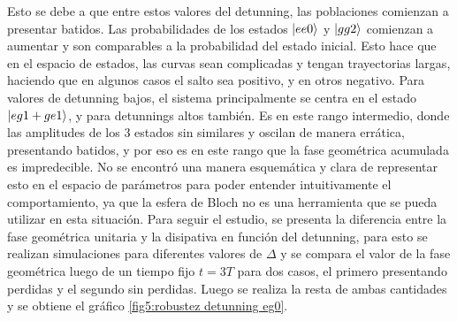 Esto se debe a que entre estos valores del detunning, las poblaciones comienzan a presentar batidos. Las probabilidades de los estados $\ket{ee0}$ y $\ket{gg2}$ comienzan a aumentar y son comparables a la probabilidad del estado inicial. Esto hace que en el espacio de estados, las curvas sean complicadas y tengan trayectorias largas, haciendo que en algunos casos el salto sea positivo, y en otros negativo. Para valores de detunning bajos, el sistema principalmente se centra en el estado $\ket{eg1+ge1}$, y para detunnings altos también. Es en este rango intermedio, donde las amplitudes de los 3 estados sin similares y oscilan de manera errática, presentando batidos, y por eso es en este rango que la fase geométrica acumulada es impredecible. 
No se encontró una manera esquemática y clara de representar esto en el espacio de parámetros para poder entender intuitivamente el comportamiento, ya que la esfera de Bloch no es una herramienta que se pueda utilizar en esta situación. 
Para seguir el estudio, se presenta la diferencia entre la fase geométrica unitaria y la disipativa en función del detunning, para esto se realizan simulaciones para diferentes valores de $\Delta$ y se compara el valor de la fase geométrica luego de un tiempo fijo $t=3T$ para dos casos, el primero presentando perdidas y el segundo sin perdidas. Luego se realiza la resta de ambas cantidades y se obtiene el gráfico \ref{fig5:robustez detunning eg0}.

